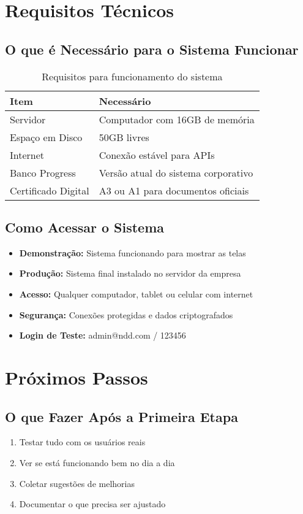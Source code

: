 \documentclass[12pt,a4paper]{article}
\begin{document}
\section{Requisitos Técnicos}

\subsection{O que é Necessário para o Sistema Funcionar}
\begin{table}[H]
    \centering
    \begin{tabularx}{\textwidth}{|l|X|}
        \hline
        \textbf{Item} & \textbf{Necessário} \\
        \hline
        Servidor & Computador com 16GB de memória \\
        Espaço em Disco & 50GB livres \\
        Internet & Conexão estável para APIs \\
        Banco Progress & Versão atual do sistema corporativo \\
        Certificado Digital & A3 ou A1 para documentos oficiais \\
        \hline
    \end{tabularx}
    \caption{Requisitos para funcionamento do sistema}
\end{table}

\subsection{Como Acessar o Sistema}
\begin{itemize}
    \item \textbf{Demonstração:} Sistema funcionando para mostrar as telas
    \item \textbf{Produção:} Sistema final instalado no servidor da empresa
    \item \textbf{Acesso:} Qualquer computador, tablet ou celular com internet
    \item \textbf{Segurança:} Conexões protegidas e dados criptografados
    \item \textbf{Login de Teste:} admin@ndd.com / 123456
\end{itemize}

\section{Próximos Passos}

\subsection{O que Fazer Após a Primeira Etapa}
\begin{enumerate}
    \item Testar tudo com os usuários reais
    \item Ver se está funcionando bem no dia a dia
    \item Coletar sugestões de melhorias
    \item Documentar o que precisa ser ajustado
\end{enumerate}
\end{document}

